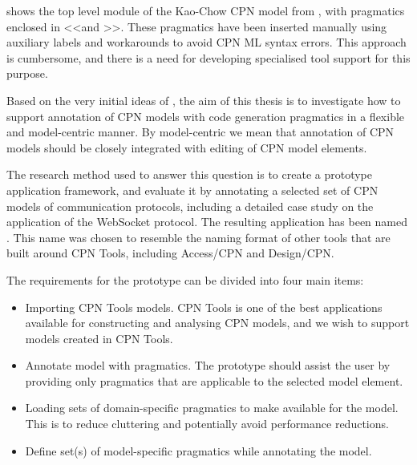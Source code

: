 shows the top level module of the Kao-Chow CPN model from
\cite{Simonsen2011}, with pragmatics enclosed in \textless\textless and
\textgreater\textgreater. These pragmatics have been inserted manually using
auxiliary labels and workarounds to avoid CPN ML syntax errors. This approach is
cumbersome, and there is a need for developing specialised tool support for this
purpose.

Based on the very initial ideas of \cite{Simonsen2011}, the aim of this thesis
is to investigate how to support annotation of CPN models with code generation
pragmatics in a flexible and model-centric manner. By model-centric we mean that
annotation of CPN models should be closely integrated with editing of CPN model
elements.

The research method used to answer this question is to create a prototype
application framework, and evaluate it by annotating a selected set of CPN
models of communication protocols, including a detailed case study on the
application of the WebSocket protocol. The resulting application has been named
\thename{}. This name was chosen to resemble the naming format of other tools that
are built around CPN Tools, including Access/CPN and Design/CPN.

The requirements for the prototype can be divided into four main items:

\begin{itemize} 
	\item Importing CPN Tools models. CPN Tools is one of the best applications
	available for constructing and analysing CPN models, and we wish to
	support models created in CPN Tools.

	\item Annotate model with pragmatics. The prototype should assist the user by
	providing only pragmatics that are applicable to the selected model element.
		
	\item Loading sets of domain-specific pragmatics to make available for the
	model. This is to reduce cluttering and potentially avoid performance
	reductions.
	
	\item Define set(s) of model-specific pragmatics while annotating the model. 

\end{itemize}

